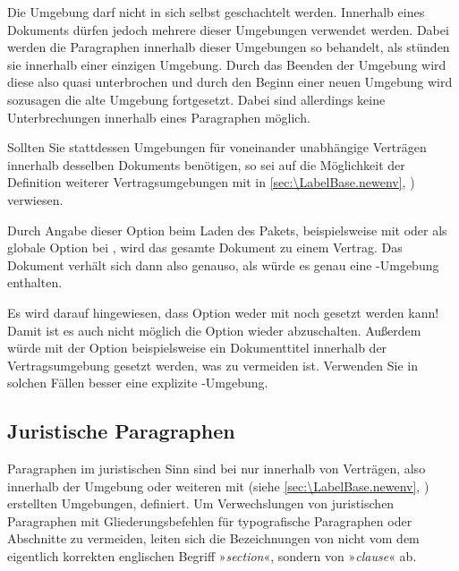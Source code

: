 Die Umgebung  darf nicht in sich
selbst geschachtelt werden. Innerhalb eines Dokuments dürfen jedoch mehrere
dieser Umgebungen verwendet werden. Dabei werden die Paragraphen innerhalb
dieser Umgebungen so behandelt, als stünden sie innerhalb einer einzigen
Umgebung. Durch das Beenden der Umgebung wird diese also quasi
unterbrochen und durch den Beginn einer neuen Umgebung wird sozusagen die alte
Umgebung fortgesetzt. Dabei sind allerdings keine Unterbrechungen innerhalb
eines Paragraphen möglich.

Sollten Sie stattdessen Umgebungen für voneinander unabhängige Verträgen
innerhalb desselben Dokuments benötigen, so sei auf die Möglichkeit der
Definition weiterer Vertragsumgebungen mit
 in
\autoref{sec:\LabelBase.newenv},
) verwiesen.%
\EndIndexGroup

\begin{Declaration}
\end{Declaration}
Durch Angabe dieser Option beim Laden des Pakets, beispielsweise mit
%
 oder als globale Option bei
%
, wird das gesamte Dokument
zu einem Vertrag. Das Dokument verhält sich dann also genauso, als würde es
genau eine -Umgebung enthalten.

Es wird darauf hingewiesen, dass Option 
weder mit  noch
 gesetzt werden kann!  Damit ist es auch
nicht möglich die Option wieder abzuschalten. Außerdem würde mit der Option
beispielsweise ein Dokumenttitel innerhalb der Vertragsumgebung
gesetzt werden, was zu vermeiden ist. Verwenden Sie in solchen Fällen
besser eine explizite -Umgebung.%
\EndIndexGroup


\subsection{Juristische Paragraphen}
\label{sec:scrjura.clause}
\BeginIndexGroup
{} 

Paragraphen im juristischen Sinn sind bei  nur innerhalb von
Verträgen, also innerhalb der Umgebung  oder
weiteren mit  (siehe
\autoref{sec:\LabelBase.newenv},
) erstellten Umgebungen,
definiert. Um Verwechslungen von juristischen Paragraphen
mit Gliederungsbefehlen für typografische Paragraphen oder Abschnitte zu
vermeiden, leiten sich die Bezeichnungen von  nicht vom dem
eigentlich korrekten englischen Begriff »\emph{section}«, sondern von
»\emph{clause}« ab.

